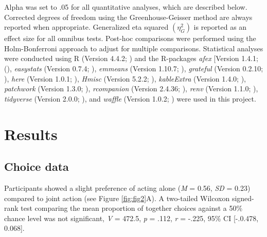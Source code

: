 \documentclass[
  man,
  floatsintext,
  longtable,
  nolmodern,
  notxfonts,
  notimes,
  mask,
  colorlinks=true,linkcolor=blue,citecolor=blue,urlcolor=blue]{apa7}
\begin{document}
Alpha was set to .05 for all quantitative analyses, which are described
below. Corrected degrees of freedom using the Greenhouse-Geisser method
are always reported when appropriate. Generalized eta squared
\((\eta_{G}^{2})\) is reported as an effect size for all omnibus tests.
Post-hoc comparisons were performed using the Holm-Bonferroni approach
to adjust for multiple comparisons. Statistical analyses were conducted
using R (Version 4.4.2; ) and the
R-packages \emph{afex} {[}Version 1.4.1; (), \emph{easystats} (Version 0.7.4;
), \emph{emmeans} (Version
1.10.7; ), \emph{grateful} (Version
0.2.10; ),
\emph{here} (Version 1.0.1; ),
\emph{Hmisc} (Version 5.2.2; ),
\emph{kableExtra} (Version 1.4.0; ),
\emph{patchwork} (Version 1.3.0; ), \emph{rcompanion} (Version 2.4.36;
), \emph{renv} (Version
1.1.0; ), \emph{tidyverse}
(Version 2.0.0; ), and
\emph{waffle} (Version 1.0.2; ) were used in this project.

\section{Results}\label{results}

\subsection{Choice data}\label{choice-data-1}

Participants showed a slight preference of acting alone (\emph{M} =
0.56, \emph{SD} = 0.23) compared to joint action (see Figure
\ref{fig:fig2}A). A two-tailed Wilcoxon signed-rank test comparing the
mean proportion of together choices against a 50\% chance level was not
significant, \emph{V} = 472.5, \emph{p} = .112, \emph{r} = -.225, 95\%
CI {[}-.0.478, 0.068{]}.

\clearpage
\end{document}
